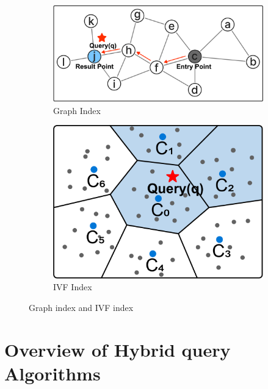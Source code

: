 \documentclass[sigconf, nonacm]{acmart}
\begin{document}
	\begin{figure}
		\begin{subfigure}{0.60\columnwidth}
			\centering
			
			\includegraphics[width=\linewidth]{figures/graph.pdf}
			\caption{Graph Index}
			\label{fig:graph}
		\end{subfigure}
		\hfill
		\begin{subfigure}{0.38\columnwidth}
			\centering
			
			\includegraphics[width=\linewidth]{figures/ivf.pdf}
			\caption{IVF Index}
			\label{fig:ivf}
		\end{subfigure}
		
		\setlength{\abovecaptionskip}{0.1cm}
		\setlength{\belowcaptionskip}{0.2cm}
		\caption{Graph index and IVF index}
		
	\end{figure}
	
	
	\section{Overview of Hybrid query Algorithms}
	
\end{document}
